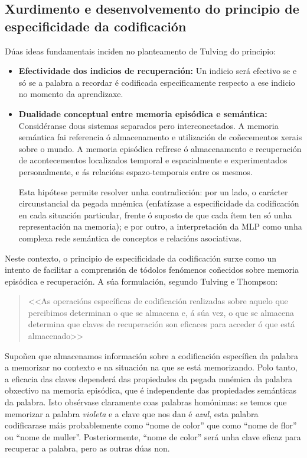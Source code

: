 \documentclass[a4paper,11pt]{article}
\begin{document}
\subsection{Xurdimento e desenvolvemento do principio de especificidade da codificación}
Dúas ideas fundamentais inciden no planteamento de Tulving do principio:
\begin{itemize}
	\item \textbf{Efectividade dos indicios de recuperación:} Un indicio será efectivo se e só se a 
	palabra a recordar é codificada especificamente respecto a ese indicio no momento da 
	aprendizaxe.
	\item \textbf{Dualidade conceptual entre memoria episódica e semántica:} Considéranse dous 
	sistemas separados pero interconectados. A memoria semántica fai referencia ó almacenamento e 
	utilización de coñecementos xerais sobre o mundo. A memoria episódica refírese ó almacenamento e 
	recuperación de acontecementos localizados temporal e espacialmente e experimentados
	personalmente, e ás relacións espazo-temporais entre os mesmos.
	
	Esta hipótese permite resolver unha contradicción: por un lado, o carácter circunstancial da 
	pegada mnémica (enfatízase a especificidade da codificación en cada situación particular, frente 
	ó suposto de que cada ítem ten só unha representación na memoria); e por outro, a interpretación 
	da MLP como unha complexa rede semántica de conceptos e relacións asociativas.
\end{itemize}

Neste contexto, o principio de especificidade da codificación surxe como un intento de facilitar a comprensión de tódolos fenómenos coñecidos sobre memoria episódica e recuperación. A súa formulación, segundo Tulving e Thompson:

\begin{quote}
	<<As operacións específicas de codificación realizadas sobre aquelo que percibimos determinan 
	o que se almacena e, á súa vez, o que se almacena determina que claves de recuperación son 
	eficaces para acceder ó que está almacenado>>
\end{quote}

Supoñen que almacenamos información sobre a codificación específica da palabra a memorizar no contexto e na situación na que se está memorizando. Polo tanto, a eficacia das claves dependerá das propiedades da pegada mnémica da palabra obxectivo na memoria episódica, que é independente das propiedades semánticas da palabra. Isto obsérvase claramente coas palabras homónimas: se temos que memorizar a palabra \textit{violeta} e a clave que nos dan é \textit{azul}, esta palabra codificarase máis probablemente como ``nome de color'' que como ``nome de flor'' ou ``nome de muller''. Posteriormente, ``nome de color'' será unha clave eficaz para recuperar a palabra, pero as outras dúas non.
\end{document}
